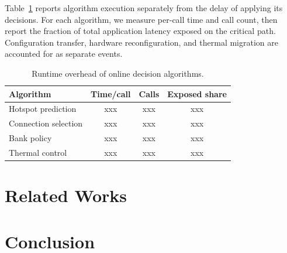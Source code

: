 \documentclass[conference,10pt]{IEEEtran}
\begin{document}
Table~\ref{tab:eval-runtime} reports algorithm execution separately from the delay of applying its decisions. For each algorithm, we measure per-call time and call count, then report the fraction of total application latency exposed on the critical path. Configuration transfer, hardware reconfiguration, and thermal migration are accounted for as separate events.

\begin{table}[t]
\caption{Runtime overhead of online decision algorithms.}
\label{tab:eval-runtime}
\centering\small
\begin{tabular}{@{}lccc@{}}
\hline
Algorithm & Time/call & Calls & Exposed share \\
\hline
Hotspot prediction & xxx & xxx & xxx \\
Connection selection & xxx & xxx & xxx \\
Bank policy & xxx & xxx & xxx \\
Thermal control & xxx & xxx & xxx \\
\hline
\end{tabular}
\end{table}

\section{Related Works}
\label{sec:related-works}

\section{Conclusion}
\label{sec:conclusion}



\end{document}
